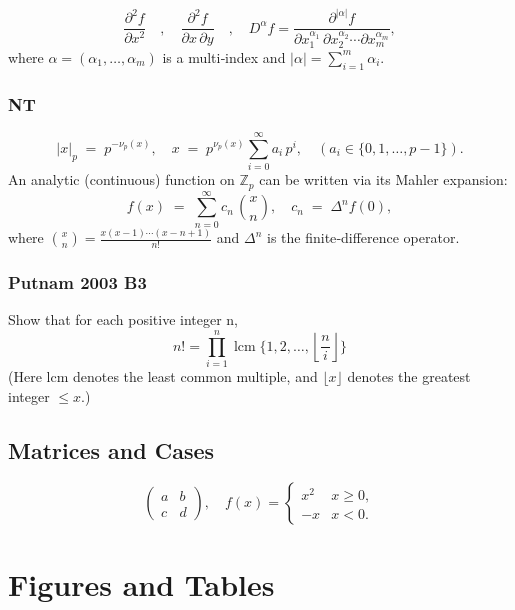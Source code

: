 \documentclass[12pt,a4paper]{article}
\begin{document}
\[
  \frac{\partial^2 f}{\partial x^2}
  \quad,\quad
  \frac{\partial^2 f}{\partial x\,\partial y}
  \quad,\quad
  D^{\alpha}f
  = \frac{\partial^{|\alpha|}f}
         {\partial x_1^{\alpha_1}\,\partial x_2^{\alpha_2}\cdots\partial x_m^{\alpha_m}},
\]
where \(\alpha=(\alpha_1,\dots,\alpha_m)\) is a multi‑index and \(|\alpha|=\sum_{i=1}^m\alpha_i\).

\subsubsection{NT}

\[
  |x|_p \;=\; p^{-\nu_p(x)},
  \quad
  x \;=\; p^{\nu_p(x)}\sum_{i=0}^\infty a_i\,p^i,
  \quad(a_i\in\{0,1,\dots,p-1\}).
\]
An analytic (continuous) function on \(\mathbb{Z}_p\) can be written via its Mahler expansion:
\[
  f(x) \;=\;\sum_{n=0}^\infty c_n\,\binom{x}{n},
  \quad
  c_n \;=\;\Delta^n f(0),
\]
where \(\binom{x}{n}=\tfrac{x(x-1)\cdots(x-n+1)}{n!}\) and \(\Delta^n\) is the finite‐difference operator.

\subsubsection{Putnam 2003 B3}

Show that for each positive integer n,\[n!=\prod_{i=1}^n \; \text{lcm} \; \{1, 2, \ldots, \left\lfloor\frac{n}{i} \right\rfloor\}\](Here lcm denotes the least common multiple, and $\lfloor x\rfloor$ denotes the greatest integer $\le x$.)


\subsection{Matrices and Cases}
\[
  \begin{pmatrix}
    a & b \\
    c & d
  \end{pmatrix},
  \quad
  f(x)=
  \begin{cases}
    x^2 & x\ge0,\\
    -x  & x<0.
  \end{cases}
\]

\section{Figures and Tables}
\end{document}
